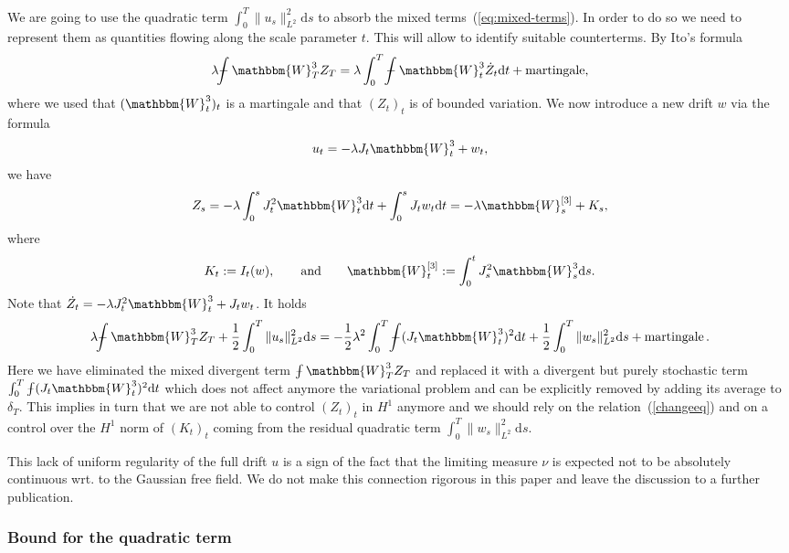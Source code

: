 \documentclass[11pt, oneside]{article}   	%
\newcommand{\assign}{:=}
\newcommand{\mathd}{\mathrm{d}}
\newcommand{\tmop}[1]{\ensuremath{\operatorname{#1}}}
\def\Xint#1{\mathchoice
{\XXint\displaystyle\textstyle{#1}}%
{\XXint\textstyle\scriptstyle{#1}}%
{\XXint\scriptstyle\scriptscriptstyle{#1}}%
{\XXint\scriptscriptstyle\scriptscriptstyle{#1}}%
\!\int}
\def\XXint#1#2#3{{\setbox0=\hbox{$#1{#2#3}{\int}$ }
\vcenter{\hbox{$#2#3$ }}\kern-.6\wd0}}
\def\dashint{\Xint-}
\newcommand{\bint}{\dashint}
\begin{document}
We are going to use the quadratic term $\int_0^T \| u_s \|^2_{L^2} \mathd s$
to absorb the mixed terms~(\ref{eq:mixed-terms}). In order to do so we need to
represent them as quantities flowing along the scale parameter $t$. This will
allow to identify suitable counterterms. By Ito's formula
\[ \lambda \bint \mathbbm{W}_T^3 Z_T = \lambda \int_0^T \bint
   \mathbbm{W}_t^3 \dot{Z}_t \mathd t + \text{martingale}, \]
where we used that $(\mathbbm{W}_t^3)_t$ is a martingale and that $(Z_t)_t$ is
of bounded variation. We now introduce a new drift $w$ via the formula
\begin{equation}
  u_t = - \lambda J_t \mathbbm{W}_t^3 + w_t, \label{eq:ansatz-1}
\end{equation}
we have
\begin{equation}
  \label{changeeq} Z_s = - \lambda \int_0^s J^2_t \mathbbm{W}_t^3 \mathd t
  + \int_0^s J_t w_t \mathd t = - \lambda \mathbbm{W}_s^{[3]} + K_s,
\end{equation}
where
\[ K_t \assign I_t (w), \qquad \text{and} \qquad \mathbbm{W}_t^{[3]} \assign
   \int_0^t J^2_s \mathbbm{W}_s^3 \mathd s. \]
Note that $\dot{Z_t} = - \lambda J^2_t \mathbbm{W}_t^3 + J_t w_t$. It holds
\[ \lambda \bint \mathbbm{W}_T^3 Z_T + \frac{1}{2} \int_0^T \| u_s \|^2_{L^2}
   \mathd s = - \frac{1}{2} \lambda^2 \int_0^T \bint (J_t \mathbbm{W}_t^3)^2
   \mathd t + \frac{1}{2} \int_0^T \| w_s \|^2_{L^2} \mathd s +
   \tmop{martingale} . \]
Here we have eliminated the mixed divergent term $\bint \mathbbm{W}_T^3 Z_T$
and replaced it with a divergent but purely stochastic term $\int_0^T \bint
(J_t \mathbbm{W}_t^3)^2 \mathd t$ which does not affect anymore the
variational problem and can be explicitly removed by adding its average to
$\delta_T$. This implies in turn that we are not able to control $(Z_t)_t$ in
$H^1$ anymore and we should rely on the relation~(\ref{changeeq}) and on a
control over the $H^1$ norm of $(K_t)_t$ coming from the residual quadratic
term $\int_0^T \| w_s \|^2_{L^2} \mathd s$.

\begin{remark}
  This lack of uniform regularity of the full drift $u$ is a sign of the fact
  that the limiting measure $\nu$ is expected not to be absolutely continuous
  wrt. to the Gaussian free field. We do not make this connection rigorous in
  this paper and leave the discussion to a further publication.
\end{remark}

\subsubsection{Bound for the quadratic term}
\end{document}
